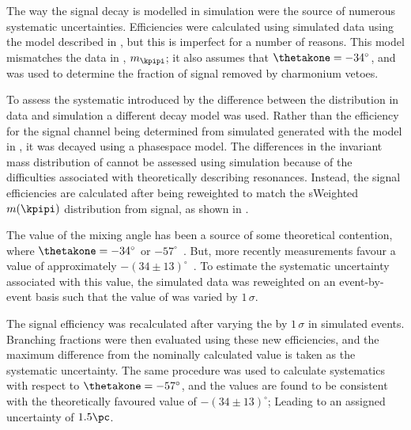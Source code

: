 The way the signal decay is modelled in simulation were the source of numerous systematic
uncertainties.
Efficiencies were calculated using simulated data using the model described in
, but this is imperfect for a number of reasons.
This model mismatches the data in \qsq, $m_\kpipi$; it also assumes that $\thetakone=-34^\circ$,
and was used to determine the fraction of signal removed by charmonium vetoes.

To assess the systematic introduced by the difference between the \qsq distribution in data and
simulation a different decay model was used.
Rather than the efficiency for the signal channel being determined from simulated
 generated with the model in , it was decayed
using a phasespace model.
The differences in the invariant mass distribution of \kpipi cannot be assessed using simulation
because of the difficulties associated with theoretically describing \kpipi resonances.
Instead, the signal efficiencies are calculated after being reweighted to match the sWeighted
$m(\kpipi)$ distribution from signal, as shown in .

The value of the mixing angle \thetakone has been a source of some theoretical contention, where
$\thetakone=-34^\circ$ or
$-57^\circ$~\cite{PhysRevD.47.1252,Tayduganov:2011ui,Hatanaka:2008xj,Cheng:2011pb,Divotgey:2013jba,Cheng:2013cwa}.
But, more recently measurements favour a value of approximately
$-(34\pm13)^\circ$~\cite{Hatanaka:2008xj,Cheng:2011pb,Divotgey:2013jba,Cheng:2013cwa}.
To estimate the systematic uncertainty associated with this value, the simulated data was
reweighted on an event-by-event basis such that the value of \thetakone was varied by $1\,\sigma$.


The signal efficiency was recalculated after varying the \thetakone by $1\,\sigma$ in simulated
 events.
Branching fractions were then evaluated using these new efficiencies, and the maximum difference
from the nominally calculated value is taken as the systematic uncertainty.
The same procedure was used to calculate systematics with respect to $\thetakone=-57^\circ$, and
the values are found to be consistent with the theoretically favoured value of $-(34\pm13)^\circ$;
Leading to an assigned uncertainty of \approx$1.5\pc$.

